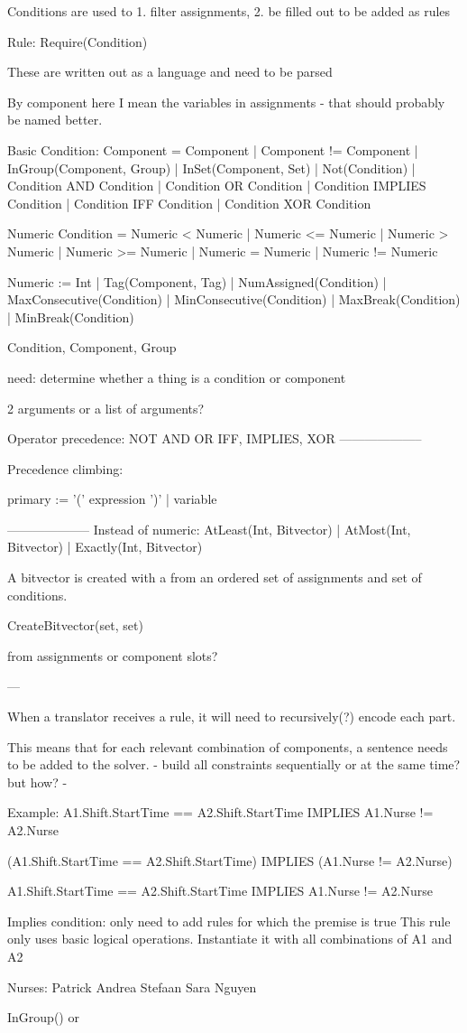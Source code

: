 Conditions are used to 1. filter assignments, 2. be filled out to be added as rules

Rule: Require(Condition)

These are written out as a language and need to be parsed

By component here I mean the variables in assignments - that should probably be named better.

Basic Condition: Component = Component | Component != Component | InGroup(Component, Group) | InSet(Component, Set) | Not(Condition) | Condition AND Condition | Condition OR Condition | Condition IMPLIES Condition | Condition IFF Condition | Condition XOR Condition 

Numeric Condition = Numeric < Numeric | Numeric <= Numeric | Numeric > Numeric | Numeric >= Numeric | Numeric = Numeric | Numeric != Numeric

Numeric := Int | Tag(Component, Tag) | NumAssigned(Condition) | MaxConsecutive(Condition) | MinConsecutive(Condition) | MaxBreak(Condition) | MinBreak(Condition)

Condition, Component, Group

need: determine whether a thing is a condition or component

2 arguments or a list of arguments?

Operator precedence:
NOT
AND
OR
IFF, IMPLIES, XOR
--------------------

Precedence climbing:


primary := '(' expression ')' | variable  


--------------------
Instead of numeric:
AtLeast(Int, Bitvector) | AtMost(Int, Bitvector) | Exactly(Int, Bitvector) 

A bitvector is created with a from an ordered set of assignments and set of conditions.

CreateBitvector(set, set)

from assignments or component slots?

---

When a translator receives a rule, it will need to recursively(?) encode each part.

This means that for each relevant combination of components, a sentence needs to be added to the solver.
- build all constraints sequentially or at the same time? but how?
- 

Example:
A1.Shift.StartTime == A2.Shift.StartTime IMPLIES A1.Nurse != A2.Nurse

(A1.Shift.StartTime == A2.Shift.StartTime) IMPLIES (A1.Nurse != A2.Nurse)

A1.Shift.StartTime == A2.Shift.StartTime IMPLIES A1.Nurse != A2.Nurse

Implies condition: only need to add rules for which the premise is true
This rule only uses basic logical operations. Instantiate it with all combinations of A1 and A2

Nurses:
Patrick
Andrea
Stefaan
Sara
Nguyen


InGroup() or 
